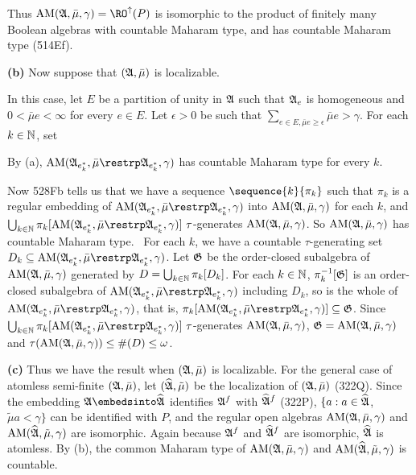 {\medskip

 Thus $\AM(\frak A,\bar\mu,\gamma)=\RO^{\uparrow}(P)$
is isomorphic to the product of finitely many Boolean algebras
with countable Maharam type, and has countable Maharam type (514Ef).

\medskip

{\bf (b)} Now suppose that
$(\frak A,\bar\mu)$ is localizable.

\medskip

 In this case, let $E$ be a partition
of unity in $\frak A$ such that $\frak A_e$ is homogeneous and
$0<\bar\mu e<\infty$ for every $e\in E$.   Let $\epsilon>0$ be such that
$\sum_{e\in E,\bar\mu e\ge\epsilon}\bar\mu e>\gamma$.
For each $k\in\Bbb N$, set


\noindent By (a),
$\AM(\frak A_{e^*_k},\bar\mu\restrp\frak A_{e^*_k},\gamma)$
has countable Maharam type for every $k$.

\medskip

 Now 528Fb tells us that we have a sequence
$\sequence{k}{\pi_k}$ such that
$\pi_k$ is a regular embedding of
$\AM(\frak A_{e^*_k},\bar\mu\restrp\frak A_{e^*_k},\gamma)$ into
$\mathop{\text{AM}}(\frak A,\bar\mu,\gamma)$ for each $k$, and
$\bigcup_{k\in\Bbb N}
\pi_k[\AM(\frak A_{e^*_k},\bar\mu\restrp\frak A_{e^*_k},\gamma)]
\,\,\tau$-generates $\mathop{\text{AM}}(\frak A,\bar\mu,\gamma)$.
So $\mathop{\text{AM}}(\frak A,\bar\mu,\gamma)$ has countable Maharam type.
\Prf\ For each $k$, we have a countable $\tau$-generating set
$D_k\subseteq\AM(\frak A_{e^*_k},\bar\mu\restrp\frak A_{e^*_k},\gamma)$.
Let $\frak G$ be the
order-closed subalgebra of $\mathop{\text{AM}}(\frak A,\bar\mu,\gamma)$ generated by
$D=\bigcup_{k\in\Bbb N}\pi_k[D_k]$.   For each $k\in\Bbb N$,
$\pi_k^{-1}[\frak G]$ is an order-closed subalgebra of
$\AM(\frak A_{e^*_k},\bar\mu\restrp\frak A_{e^*_k},\gamma)$ including
$D_k$, so is the whole of
$\AM(\frak A_{e^*_k},\bar\mu\restrp\frak A_{e^*_k},\gamma)$, that is,
$\pi_k[\AM(\frak A_{e^*_k},\bar\mu\restrp\frak A_{e^*_k},\gamma)]
\subseteq\frak G$.   Since
$\bigcup_{k\in\Bbb N}
\pi_k[\AM(\frak A_{e^*_k},\bar\mu\restrp\frak A_{e^*_k},\gamma)]
\,\,\tau$-generates $\mathop{\text{AM}}(\frak A,\bar\mu,\gamma)$,
$\frak G=\mathop{\text{AM}}(\frak A,\bar\mu,\gamma)$ and
$\tau(\mathop{\text{AM}}(\frak A,\bar\mu,\gamma))\le\#(D)\le\omega$.\ \Qed

\medskip

{\bf (c)} Thus we have the result when $(\frak A,\bar\mu)$ is localizable.
For the general case of atomless semi-finite $(\frak A,\bar\mu)$,
let $(\widehat{\frak A},\tilde\mu)$ be the
localization of $(\frak A,\bar\mu)$ (322Q).
Since the embedding $\frak A\embedsinto\widehat{\frak A}$ identifies
$\frak A^f$ with $\widehat{\frak A}^f$ (322P),
$\{a:a\in\widehat{\frak A}$, $\tilde\mu a<\gamma\}$
can be identified with $P$, and the regular open algebras
$\mathop{\text{AM}}(\frak A,\bar\mu,\gamma)$ and
$\mathop{\text{AM}}(\widehat{\frak A},\tilde\mu,\gamma)$ are isomorphic.   Again because
$\frak A^f$ and $\widehat{\frak A}^f$ are isomorphic, $\widehat{\frak A}$
is atomless.   By (b), the common Maharam type of
$\mathop{\text{AM}}(\frak A,\bar\mu,\gamma)$ and
$\mathop{\text{AM}}(\widehat{\frak A},\tilde\mu,\gamma)$ is countable.
}%

